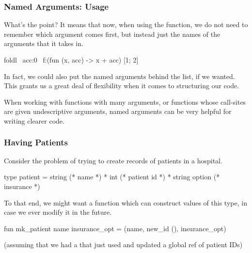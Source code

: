 \documentclass[aspectratio=169, handout]{beamer}
\begin{document}
\begin{frame}[fragile]
  \frametitle{Named Arguments: Usage}

  What's the point? It means that now, when using the  function,
  we do not need to remember which argument comes first, but instead just the
  names of the arguments that it takes in.

  \vspace{\fill}

  \begin{codeblock}
    foldl ~acc:0 ~f:(fun (x, acc) -> x + acc) [1; 2]
  \end{codeblock}

  \vspace{\fill}

  In fact, we could also put the named arguments behind the list, if we wanted.
  This grants us a great deal of flexibility when it comes to structuring our code.

  \vspace{\fill}

  When working with functions with many arguments, or functions whose call-sites
  are given undescriptive arguments, named arguments can be very helpful for writing
  clearer code.
\end{frame}

\begin{frame}[fragile]
  \frametitle{Having Patients}

  Consider the problem of trying to create records of patients in a hospital.

  \vspace{\fill}

  \begin{codeblock}
    type patient =
      string (* name *)
      * int  (* patient id *)
      * string option (* insurance *)
  \end{codeblock}

  \vspace{\fill}

  To that end, we might want a function which can construct values of this
  type, in case we ever modify it in the future.

  \vspace{\fill}

  \begin{codeblock}
    fun mk_patient name insurance_opt =
      (name, new_id (), insurance_opt)
  \end{codeblock}

  \vspace{\fill}

  (assuming that we had a  that just used and
  updated a global ref of patient IDs)
\end{frame}
\end{document}
